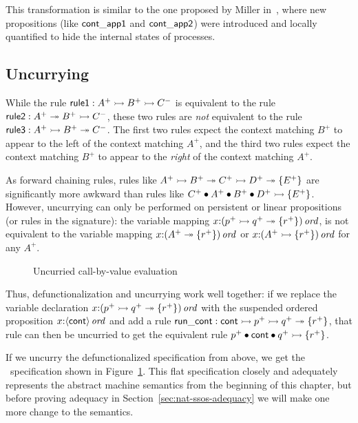 This transformation is similar to the one proposed by
Miller in~\cite{miller02higherorder}, where new propositions
(like ${\sf cont\_app1}$ and ${\sf cont\_app2}$) were
introduced and locally quantified to hide the internal states of processes.

\subsection{Uncurrying}
\label{sec:defunc-uncurry}

While the rule ${\sf rule1} : A^+ \rightarrowtail B^+ \rightarrowtail C^-$ is equivalent
to the rule ${\sf rule2} : A^+ \twoheadrightarrow B^+ \rightarrowtail C^-$, these two
rules are {\it not} equivalent to the rule ${\sf rule3} : A^+ \rightarrowtail
B^+ \twoheadrightarrow C^-$. The first two rules expect the context matching
$B^+$ to appear to the left of the context matching $A^+$, and the
third two rules expect the context matching $B^+$ to appear to the
{\it right} of the context matching $A^+$.

As forward chaining rules, rules like $A^+ \rightarrowtail B^+ \twoheadrightarrow C^+
\rightarrowtail D^+ \twoheadrightarrow \{ E^+ \}$ are significantly more awkward than
rules like $C^+ \mathbin{\bullet} A^+ \mathbin{\bullet} B^+ \mathbin{\bullet} D^+ \rightarrowtail \{ E^+
\}$. However, uncurrying can only be performed on persistent or linear
propositions (or rules in the signature): the variable mapping
$x{:}{(p^+ \rightarrowtail q^+ \twoheadrightarrow \{ r^+ \})}\,{{\it ord}}$, is not equivalent to the 
variable mapping
$x{:}{(A^+ \twoheadrightarrow \{ r^+ \})}\,{{\it ord}}$ or $x{:}{(A^+ \rightarrowtail \{ r^+ \})}\,{{\it ord}}$
for any $A^+$. 

\begin{figure}
\caption{Uncurried call-by-value evaluation}
\label{fig:cbv-uncurry}
\end{figure}

Thus, defunctionalization
and uncurrying work well together: if we replace the variable
declaration
$x{:}{(p^+ \rightarrowtail q^+ \twoheadrightarrow \{ r^+ \})}\,{{\it ord}}$ with the suspended
ordered proposition $x{:}{\langle {\sf cont} \rangle}\,{{\it ord}}$ and add a rule
${\sf run\_cont} : {\sf cont} \rightarrowtail p^+ \rightarrowtail q^+ \twoheadrightarrow \{ r^+ \}$, that rule can 
then be uncurried to get the equivalent rule
$p^+ \mathbin{\bullet} {\sf cont} \mathbin{\bullet} q^+ \rightarrowtail \{ r^+ \}$.

If we uncurry the defunctionalized specification from above, we get
the \sls~specification shown in Figure~\ref{fig:cbv-uncurry}. This
flat specification closely and adequately represents the abstract
machine semantics from the beginning of this chapter, but before
proving adequacy in Section~\ref{sec:nat-ssos-adequacy} we
will make one more change to the semantics.

